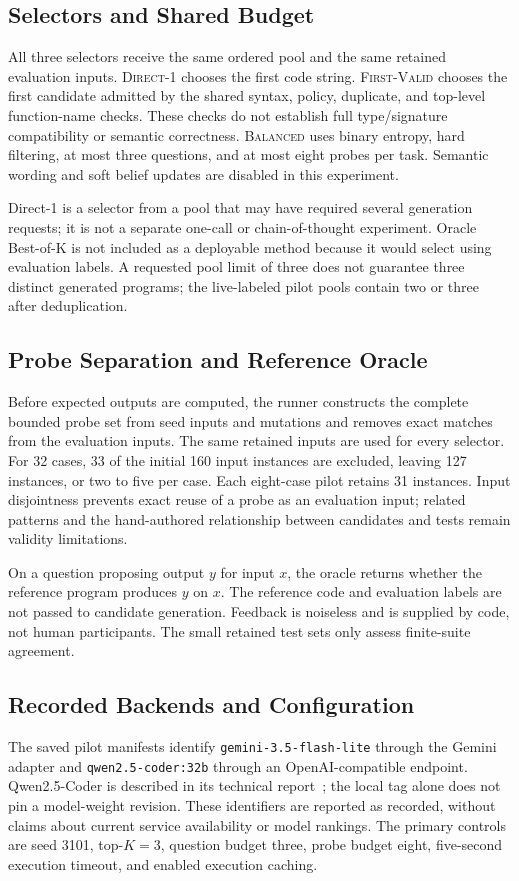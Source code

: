 \subsection{Selectors and Shared Budget}
All three selectors receive the same ordered pool and the same retained evaluation inputs. \textsc{Direct-1} chooses the first code string. \textsc{First-Valid} chooses the first candidate admitted by the shared syntax, policy, duplicate, and top-level function-name checks. These checks do not establish full type/signature compatibility or semantic correctness. \textsc{Balanced} uses binary entropy, hard filtering, at most three questions, and at most eight probes per task. Semantic wording and soft belief updates are disabled in this experiment.

Direct-1 is a selector from a pool that may have required several generation requests; it is not a separate one-call or chain-of-thought experiment. Oracle Best-of-K is not included as a deployable method because it would select using evaluation labels. A requested pool limit of three does not guarantee three distinct generated programs; the live-labeled pilot pools contain two or three after deduplication.

\subsection{Probe Separation and Reference Oracle}
Before expected outputs are computed, the runner constructs the complete bounded probe set from seed inputs and mutations and removes exact matches from the evaluation inputs. The same retained inputs are used for every selector. For 32 cases, 33 of the initial 160 input instances are excluded, leaving 127 instances, or two to five per case. Each eight-case pilot retains 31 instances. Input disjointness prevents exact reuse of a probe as an evaluation input; related patterns and the hand-authored relationship between candidates and tests remain validity limitations.

On a question proposing output $y$ for input $x$, the oracle returns whether the reference program produces $y$ on $x$. The reference code and evaluation labels are not passed to candidate generation. Feedback is noiseless and is supplied by code, not human participants. The small retained test sets only assess finite-suite agreement.

\subsection{Recorded Backends and Configuration}
The saved pilot manifests identify \texttt{gemini-3.5-flash-lite} through the Gemini adapter and \texttt{qwen2.5-coder:32b} through an OpenAI-compatible endpoint. Qwen2.5-Coder is described in its technical report~\cite{qwen25coder}; the local tag alone does not pin a model-weight revision. These identifiers are reported as recorded, without claims about current service availability or model rankings. The primary controls are seed 3101, top-$K=3$, question budget three, probe budget eight, five-second execution timeout, and enabled execution caching.

